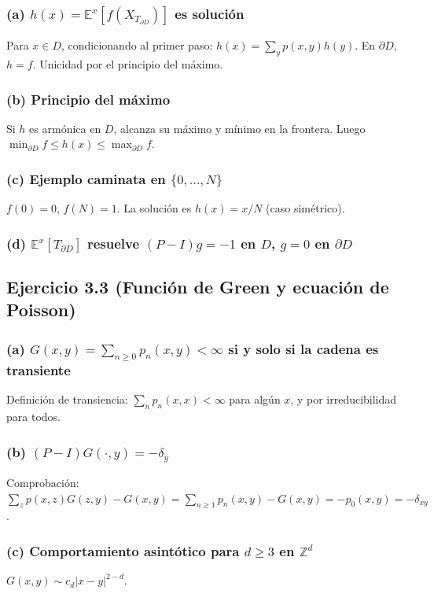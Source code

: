 \documentclass[letterpaper, 12pt]{article}
\newcommand{\E}{\mathbb{E}}
\newcommand{\Z}{\mathbb{Z}}
\newcommand{\1}{\mathbbm{1}}
\begin{document}
    \subsubsection*{(a) $h(x)=\E^x[f(X_{T_{\partial D}})]$ es soluci\'on}
    Para $x\in D$, condicionando al primer paso: $h(x)=\sum_y p(x,y)h(y)$. En $\partial D$, $h=f$. Unicidad por el principio del m\'aximo.

    \subsubsection*{(b) Principio del m\'aximo}
    Si $h$ es arm\'onica en $D$, alcanza su m\'aximo y m\'inimo en la frontera. Luego $\min_{\partial D}f\le h(x)\le\max_{\partial D}f$.

    \subsubsection*{(c) Ejemplo caminata en $\{0,\dots,N\}$}
    $f(0)=0$, $f(N)=1$. La soluci\'on es $h(x)=x/N$ (caso sim\'etrico).

    \subsubsection*{(d) $\E^x[T_{\partial D}]$ resuelve $(P-I)g=-1$ en $D$, $g=0$ en $\partial D$}

    \subsection{Ejercicio 3.3 (Funci\'on de Green y ecuaci\'on de Poisson)}

    \subsubsection*{(a) $G(x,y)=\sum_{n\ge0}p_n(x,y)<\infty$ si y solo si la cadena es transiente}
    Definici\'on de transiencia: $\sum_n p_n(x,x)<\infty$ para alg\'un $x$, y por irreducibilidad para todos.

    \subsubsection*{(b) $(P-I)G(\cdot,y)=-\delta_y$}
    Comprobaci\'on: $\sum_z p(x,z)G(z,y)-G(x,y)=\sum_{n\ge1}p_n(x,y)-G(x,y)=-p_0(x,y)=-\delta_{xy}$.

    \subsubsection*{(c) Comportamiento asint\'otico para $d\ge3$ en $\Z^d$}
    $G(x,y)\sim c_d|x-y|^{2-d}$.
\end{document}
